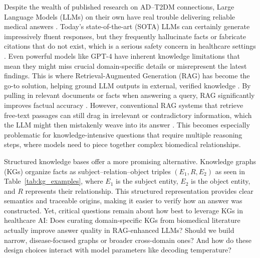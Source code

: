 Despite the wealth of published research on AD–T2DM connections, Large Language Models (LLMs) on their own have real trouble delivering reliable medical answers \cite{lacerdaevaluation}. Today's state-of-the-art (SOTA) LLMs can certainly generate impressively fluent responses, but they frequently hallucinate facts or fabricate citations that do not exist, which is a serious safety concern in healthcare settings \cite{wang2025trustworthy}. Even powerful models like GPT-4 have inherent knowledge limitations that mean they might miss crucial domain-specific details or misrepresent the latest findings. This is where Retrieval-Augmented Generation (RAG) has become the go-to solution, helping ground LLM outputs in external, verified knowledge \cite{wu2025multirag}. By pulling in relevant documents or facts when answering a query, RAG significantly improves factual accuracy \cite{wu2025multirag}. However, conventional RAG systems that retrieve free-text passages can still drag in irrelevant or contradictory information, which the LLM might then mistakenly weave into its answer \cite{wu2025multirag}. This becomes especially problematic for knowledge-intensive questions that require multiple reasoning steps, where models need to piece together complex biomedical relationships. 

\begin{table}[ht]
\centering
\caption{Examples of triples used for the knowledge graphs}
\scriptsize
\setlength{\tabcolsep}{4pt}
\renewcommand{\arraystretch}{1.1}
\label{tab:kg_examples}
\end{table}

Structured knowledge bases offer a more promising alternative. Knowledge graphs (KGs) organize facts as subject–relation–object triples $(E_1, R, E_2)$ as seen in Table~\ref{tab:kg_examples}, where $E_1$ is the subject entity, $E_2$ is the object entity, and $R$ represents their relationship. This structured representation provides clear semantics and traceable origins, making it easier to verify how an answer was constructed. Yet, critical questions remain about how best to leverage KGs in healthcare AI: Does curating domain-specific KGs from biomedical literature actually improve answer quality in RAG-enhanced LLMs? Should we build narrow, disease-focused graphs or broader cross-domain ones? And how do these design choices interact with model parameters like decoding temperature?


